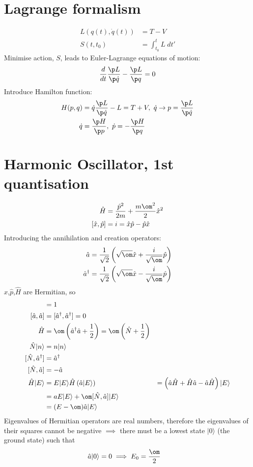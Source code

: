\documentclass[a4paper, 11pt, normalem]{report}
\begin{document}
\section{Lagrange formalism}
\begin{align}
    L\left(q(t),\dot{q}(t)\right) &= T - V \\
    S(t,t_0) &= \int_{t_0}^t L\; dt' 
\end{align}
Minimise action, $S$, leads to Euler-Lagrange equations of motion:
\begin{align}
    \frac{d}{dt} \frac{\p L}{\p\dot{q}} - \frac{\p L}{\p q} = 0
\end{align}
Introduce Hamilton function:
\begin{align}
    H(p,q) &= \dot{q}\frac{\p L}{\p \dot{q}} - L = T+V,~ \dot{q} \to p = \frac{\p L}{\p \dot{q}} \\
    \dot{q} &= \frac{\p H}{\p p},~ \dot{p} = -\frac{\p H}{\p q}
\end{align}

\section{Harmonic Oscillator, 1st quantisation}
\begin{align}
    \hat{H} &= \frac{\hat{p}^2}{2m} + \frac{m\om^2}{2}\hat{x}^2 \\
    [\hat{x},\hat{p}] &= i = \hat{x}\hat{p} - \hat{p}\hat{x}
\end{align}
Introducing the annihilation and creation operators:
\begin{align}
    \hat{a} &= \frac{1}{\sqrt{2}}\left(\sqrt{\om}\hat{x} + \frac{i}{\sqrt{\om}}\hat{p}\right) \\
    \hat{a}^\dagger &= \frac{1}{\sqrt{2}}\left(\sqrt{\om}\hat{x} - \frac{i}{\sqrt{\om}}\hat{p}\right)
\end{align}
$\hat{x}$,$\hat{p}$,$\hat{H}$ are Hermitian, so
\begin{align}
    [\hat{a},\hat{a}^\dagger] &= 1 \\
    [\hat{a},\hat{a}] &= [\hat{a}^\dagger,\hat{a}^\dagger] = 0 \\
    \hat{H} &= \om\left(\hat{a}^\dagger\hat{a} + \frac12\right) = \om\left(\hat{N}+\frac12\right) \\
    \hat{N}|n\rangle &= n|n\rangle \\
    [\hat{N},\hat{a}^\dagger] &= \hat{a}^\dagger \\
    [\hat{N},\hat{a}] &= -\hat{a} \\
    \hat{H}|E\rangle &= E|E\rangle 
    \hat{H}\left(\hat{a}|E\rangle\right) &= \left(\hat{a}\hat{H} + \hat{H}\hat{a} - \hat{a}\hat{H}\right)|E\rangle \\
                                         &= aE|E\rangle + \om[\hat{N},\hat{a}]|E\rangle \\
                                         &= (E-\om)\hat{a}|E\rangle
\end{align}
Eigenvalues of Hermitian operators are real numbers, therefore the eigenvalues of their squares cannot be negative $\implies$ there must be a lowest state $|0\rangle$ (the ground state) such that
\begin{align}
    \hat{a}|0\rangle &= 0 \implies E_0 = \frac{\om}{2}
\end{align}
\end{document}
